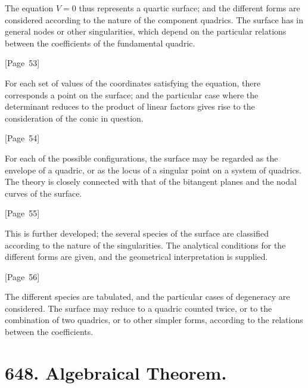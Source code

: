 \documentclass[11pt,a4paper]{article}
\theoremstyle{plain}
\theoremstyle{definition}
\theoremstyle{remark}
\begin{document}
The equation $V = 0$ thus represents a quartic surface; and the
different forms are considered according to the nature of the
component quadrics. The surface has in general nodes or other
singularities, which depend on the particular relations between the
coefficients of the fundamental quadric.

\begin{center}
[Page~53]
\end{center}

For each set of values of the coordinates satisfying the equation,
there corresponds a point on the surface; and the particular case where
the determinant reduces to the product of linear factors gives rise to
the consideration of the conic in question.

\begin{center}
[Page~54]
\end{center}

For each of the possible configurations, the surface may be regarded
as the envelope of a quadric, or as the locus of a singular point on
a system of quadrics. The theory is closely connected with that of
the bitangent planes and the nodal curves of the surface.

\begin{center}
[Page~55]
\end{center}

This is further developed; the several species of the surface are
classified according to the nature of the singularities. The
analytical conditions for the different forms are given, and the
geometrical interpretation is supplied.

\begin{center}
[Page~56]
\end{center}

The different species are tabulated, and the particular cases of
degeneracy are considered. The surface may reduce to a quadric counted
twice, or to the combination of two quadrics, or to other simpler
forms, according to the relations between the coefficients.


\newpage
\section*{648. Algebraical Theorem.}
\end{document}
